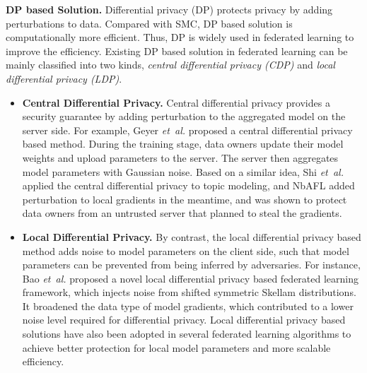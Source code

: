 \documentclass[11pt]{article}
\newcommand{\etal}{\textit{et~al.}\xspace}
\newcommand{\fakeparagraph}[1]{\vspace{1mm}\noindent\textbf{#1.}}
\begin{document}
\fakeparagraph{DP based Solution}
Differential privacy (DP) protects privacy by adding perturbations to data. Compared with SMC, DP based solution is computationally more efficient. Thus, DP is widely used in federated learning to improve the efficiency.
Existing DP based solution in federated learning can be mainly classified into two kinds, \textit{central differential privacy (CDP)} and \textit{local differential privacy (LDP)}.

\begin{itemize}
    \item \textbf{Central Differential Privacy.}
    Central differential privacy provides a security guarantee by adding perturbation to the aggregated model on the server side. For example, Geyer \etal \cite{DBLP:journals/corr/abs-1712-07557} proposed a central differential privacy based method. 
    During the training stage, data owners update their model weights and upload parameters to the server. 
    The server then aggregates model parameters with Gaussian noise. 
    Based on a similar idea, Shi \etal~\cite{is20shi} applied the central differential privacy to topic modeling, and \textsf{NbAFL} \cite{DBLP:journals/tifs/WeiLDMYFJQP20} added perturbation to local gradients in the meantime, and was shown to protect data owners from an untrusted server that planned to steal the gradients.
	
    \item \textbf{Local Differential Privacy.}
    By contrast, the local differential privacy based method adds noise to model parameters on the client side, such that model parameters can be prevented from being inferred by adversaries. 
    For instance, Bao \etal \cite{DBLP:journals/pvldb/BaoZXYOTA22} proposed a novel local differential privacy based federated learning framework, which injects noise from shifted symmetric Skellam distributions. 
	It broadened the data type of model gradients, which contributed to a lower noise level required for differential privacy.
    Local differential privacy based solutions have also been adopted in several federated learning algorithms \cite{DBLP:journals/tifs/WeiLDMYFJQP20, DBLP:conf/dasfaa/LiuCYC20, DBLP:conf/isit/SeifTL20, wangaaai20} to achieve better protection for local model parameters and more scalable efficiency.
\end{itemize}
\end{document}

